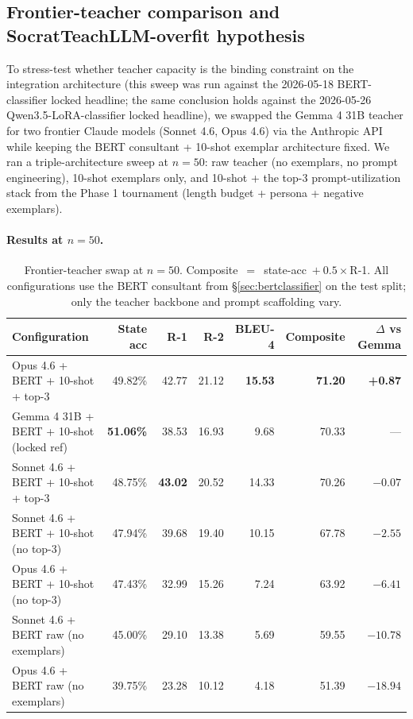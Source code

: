 \documentclass[11pt]{article}
\begin{document}
\subsection{Frontier-teacher comparison and SocratTeachLLM-overfit hypothesis}
\label{sec:claude-overfit}

To stress-test whether teacher capacity is the binding constraint on the integration architecture (this sweep was run against the 2026-05-18 BERT-classifier locked headline; the same conclusion holds against the 2026-05-26 Qwen3.5-LoRA-classifier locked headline), we swapped the Gemma 4 31B teacher for two frontier Claude models (Sonnet 4.6, Opus 4.6) via the Anthropic API while keeping the BERT consultant + 10-shot exemplar architecture fixed. We ran a triple-architecture sweep at $n{=}50$: raw teacher (no exemplars, no prompt engineering), 10-shot exemplars only, and 10-shot + the top-3 prompt-utilization stack from the Phase 1 tournament (length budget + persona + negative exemplars).

\paragraph{Results at $n{=}50$.}

\begin{table}[t]
\centering
\small
\begin{tabular}{lrrrrrr}
\toprule
Configuration & State acc & R-1 & R-2 & BLEU-4 & Composite & $\Delta$ vs Gemma \\
\midrule
Opus 4.6 + BERT + 10-shot + top-3 & 49.82\% & 42.77 & 21.12 & \textbf{15.53} & \textbf{71.20} & \textbf{+0.87} \\
Gemma 4 31B + BERT + 10-shot (locked ref) & \textbf{51.06\%} & 38.53 & 16.93 & 9.68 & 70.33 & --- \\
Sonnet 4.6 + BERT + 10-shot + top-3 & 48.75\% & \textbf{43.02} & 20.52 & 14.33 & 70.26 & $-0.07$ \\
Sonnet 4.6 + BERT + 10-shot (no top-3) & 47.94\% & 39.68 & 19.40 & 10.15 & 67.78 & $-2.55$ \\
Opus 4.6 + BERT + 10-shot (no top-3) & 47.43\% & 32.99 & 15.26 & 7.24 & 63.92 & $-6.41$ \\
Sonnet 4.6 + BERT raw (no exemplars) & 45.00\% & 29.10 & 13.38 & 5.69 & 59.55 & $-10.78$ \\
Opus 4.6 + BERT raw (no exemplars) & 39.75\% & 23.28 & 10.12 & 4.18 & 51.39 & $-18.94$ \\
\bottomrule
\end{tabular}
\caption{Frontier-teacher swap at $n{=}50$. Composite~$={}$~state-acc~$+~0.5{\times}$R-1. All configurations use the BERT consultant from \S\ref{sec:bertclassifier} on the test split; only the teacher backbone and prompt scaffolding vary.}
\label{tab:claude-triple-arch}
\end{table}
\end{document}
